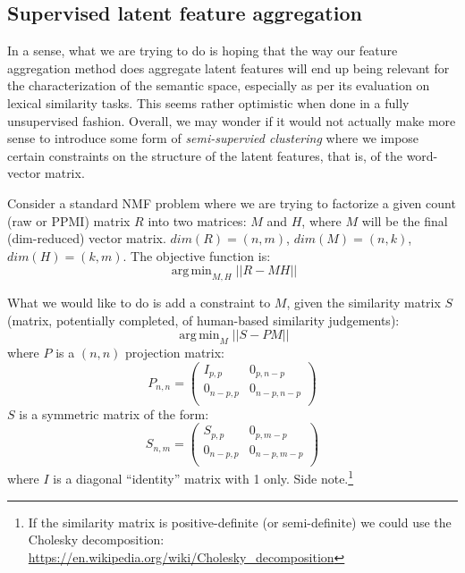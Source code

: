 \documentclass[utf8]{article}
\DeclareMathOperator*{\argmin}{arg\,min}
\begin{document}
\subsection{Supervised latent feature aggregation}
In a sense, what we are trying to do is hoping that the way our feature aggregation method does aggregate latent features will end up being relevant for the characterization of the semantic space, especially as per its evaluation on lexical similarity tasks. This seems rather optimistic when done in a fully unsupervised fashion.
Overall, we may wonder if it would not actually make more sense to introduce some form of \emph{semi-supervied clustering} where we impose certain constraints on the structure of the latent features, that is, of the word-vector matrix.

Consider a standard NMF problem where we are trying to factorize a given count (raw or PPMI) matrix $R$ into two matrices: $M$ and $H$, where $M$ will be the final (dim-reduced) vector matrix. $dim(R) = (n,m)$, $dim(M)=(n,k)$, $dim(H)=(k,m)$. The objective function is:
\begin{equation}
  \argmin_{M,H} ||R-MH||
\end{equation}

What we would like to do is add a constraint to $M$, given the similarity matrix $S$ (matrix, potentially completed, of human-based similarity judgements):
\begin{equation}
  \argmin_{M} ||S-PM||
\end{equation}
where $P$ is a $(n,n)$ projection matrix:
\begin{equation}
  P_{n,n} =
 \begin{pmatrix}
  I_{p,p} & 0_{p,n-p} \\
  0_{n-p,p} & 0_{n-p,n-p} \\
 \end{pmatrix}
\end{equation}
$S$ is a symmetric matrix of the form:
\begin{equation}
  S_{n,m} =
  \begin{pmatrix}
   S_{p,p} & 0_{p,m-p} \\
   0_{n-p,p} & 0_{n-p,m-p} \\
  \end{pmatrix}
\end{equation}
where $I$ is a diagonal ``identity'' matrix with 1 only.
Side note.\footnote{If the similarity matrix is positive-definite (or semi-definite) we could use the
Cholesky decomposition: \url{https://en.wikipedia.org/wiki/Cholesky_decomposition}}
\end{document}
